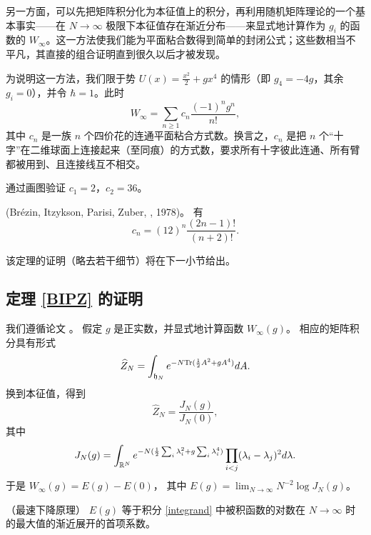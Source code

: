 另一方面，可以先把矩阵积分化为本征值上的积分，再利用随机矩阵理论的一个基本事实——在 $N\to \infty$ 极限下本征值存在渐近分布——来显式地计算作为 $g_i$ 的函数的 $W_\infty$。这一方法使我们能为平面粘合数得到简单的封闭公式；这些数相当不平凡，其直接的组合证明直到很久以后才被发现。

为说明这一方法，我们限于势 $U(x)=\frac{x^2}{2}+gx^4$ 的情形（即 $g_4=-4g$，其余 $g_i=0$），并令 $\hbar=1$。此时
$$
W_\infty=\sum_{n\ge 1}c_n\frac{(-1)^ng^n}{n!},
$$
其中 $c_n$ 是一族 $n$ 个四价花的连通平面粘合方式数。换言之，$c_n$ 是把 $n$ 个“十字”在二维球面上连接起来（至同痕）的方式数，要求所有十字彼此连通、所有臂都被用到、且连接线互不相交。

\begin{exercise} 通过画图验证 $c_1=2$，$c_2=36$。
\end{exercise} 

\begin{theorem}\label{BIPZ} (Br\'ezin, Itzykson, Parisi, Zuber, \cite{BIPZ}, 1978)。
有
$$
c_n=(12)^n \frac{(2n-1)!}{(n+2)!}.
$$
\end{theorem}

该定理的证明（略去若干细节）将在下一小节给出。

\subsection{定理 \ref{BIPZ} 的证明}
我们遵循论文 \cite{BIPZ}。
假定 $g$ 是正实数，并显式地计算函数 $W_\infty(g)$。
相应的矩阵积分具有形式
$$
\widehat Z_N=\int_{{\frak h}_N}e^{-N\Tr(\frac{1}{2}A^2+gA^4)}dA.
$$
换到本征值，得到
$$
\widehat Z_N=\frac{J_N(g)}{J_N(0)},
$$
其中
\begin{equation}\label{integrand} 
J_N(g)=\int_{\Bbb R^N}
e^{-N(\frac{1}{2}\sum_i \lambda_i^2+g\sum_i \lambda_i^4)}
\prod_{i<j} (\lambda_i-\lambda_j)^2d\lambda.
\end{equation} 
于是 $W_\infty(g)=E(g)-E(0)$，
其中 $E(g)=\lim_{N\to \infty}N^{-2}\log J_N(g)$。

\begin{proposition}（最速下降原理）
$E(g)$ 等于积分 \eqref{integrand} 中被积函数的对数在 $N\to \infty$ 时的最大值的渐近展开的首项系数。
\end{proposition}

